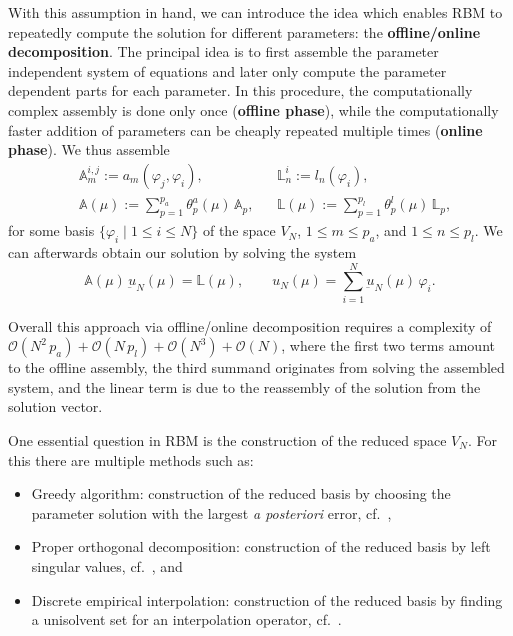 With this assumption in hand, we can introduce the idea which enables RBM to repeatedly compute the solution for different parameters: the \textbf{offline/online decomposition}.
The principal idea is to first assemble the parameter independent system of equations and later only compute the parameter dependent parts for each parameter.
In this procedure, the computationally complex assembly is done only once (\textbf{offline phase}), while the computationally faster addition of parameters can be cheaply repeated multiple times (\textbf{online phase}).
We thus assemble
\begin{align*}\label{OffOnComp}
    &\mathbb{A}^{i, j}_m := a_m(\varphi_j, \varphi_i), &&\mathbb{L}^i_n := l_n(\varphi_i), \tag*{(offline)} \\
    &\mathbb{A}(\mu) := \sum\limits_{p = 1}^{p_a} \theta_p^a(\mu)\, \mathbb{A}_p, &&\mathbb{L}(\mu) := \sum\limits_{p = 1}^{p_l} \theta_p^l(\mu)\, \mathbb{L}_p, \tag*{(online)}
\end{align*}
for some basis $\{ \varphi_i \; | \; 1 \leq i \leq N \}$ of the space $V_N$, $1 \leq m \leq p_a$, and $1 \leq n \leq p_l$.
We can afterwards obtain our solution by solving the system
\begin{equation*}\label{OnOffSystem}
    \mathbb{A}(\mu)\, \underbar{u}_N(\mu) = \mathbb{L}(\mu), \qquad u_N(\mu) = \sum\limits_{i = 1}^N \underbar{u}_N(\mu)\, \varphi_i.
\end{equation*}

Overall this approach via offline/online decomposition requires a complexity of $\mathcal{O}(N^2 \, p_a) + \mathcal{O}(N \, p_l) + \mathcal{O}(N^3) + \mathcal{O}(N)$, where the first two terms amount to the offline assembly, the third summand originates from solving the assembled system, and the linear term is due to the reassembly of the solution from the solution vector.

One essential question in RBM is the construction of the reduced space $V_N$. For this there are multiple methods such as:
\begin{itemize}
    \item Greedy algorithm: construction of the reduced basis by choosing the parameter solution with the largest \textit{a posteriori} error, cf.~\cite{DeVore2013, Veroy2003},
    \item Proper orthogonal decomposition: construction of the reduced basis by left singular values, cf.~\cite{Kunisch2001, Haasdonk2008}, and
    \item Discrete empirical interpolation: construction of the reduced basis by finding a unisolvent set for an interpolation operator, cf.~\cite{Barrault2004, Carlberg2011, Chaturantabut2010, Drohmann2012}.
\end{itemize}


